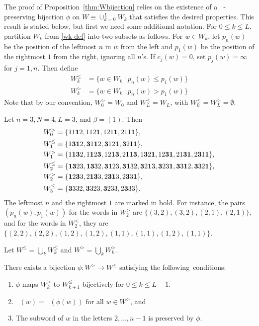\documentclass[ALCO,Unicode]{cedram}
\DeclareMathOperator{\quinvL}{\quinv^{(\ell)}}
\DeclareMathOperator{\quinv}{quinv}
\begin{document}
The proof of Proposition~\ref{thm:Wbijection} relies on the existence of a $\quinvL$-preserving bijection $\phi$ on $W \equiv \cup_{k=0}^L W_k$ that satisfies the desired properties. This result is stated below, but first we need some additional notation. For $0 \leq k \leq L$, partition $W_k$ from \eqref{wk-def} into two subsets as follows. For $w \in W_k$, let $p_n(w)$ be the position of the leftmost $n$ in $w$ from the left and $p_1(w)$ be the position of the rightmost $1$ from the right, ignoring all $n$'s. If $c_j(w)=0$, set $p_j(w)=\infty$ for $j=1,n$. Then define
\begin{align*}
W_k^{\leq}& = \{w\in W_k\ |\ p_n(w) \leq p_1(w)\} \\
W_k^>&= \{w\in W_k\ |\ p_n(w) > p_1(w)\}
\end{align*}
Note that by our convention, $W_0^>=W_0$ and $W_L^\leq=W_L$, with $W_0^\leq=W_L^>=\emptyset$.  
\begin{example}\label{Wkleq-eg}
Let $n=3, N=4, L=3$, and $\beta=(1)$. Then
\begin{align*}
W_0^>&=\{11{\bf1}2,112{\bf1},121{\bf1},211{\bf1}\},\\
W_1^\leq&=\{1{\bf31}2,{\bf3}1{\bf1}2,{\bf3}12{\bf1}, {\bf3}21{\bf1}\},\\
W_1^>&=\{1{\bf13}2, 1{\bf1}2{\bf3},12{\bf13},21{\bf13}, 1{\bf3}2{\bf1},12{\bf31},21{\bf31},2{\bf3}1{\bf1} \}, \\
W_2^\leq &= \{{\bf1 3} 2 3 ,  {\bf1 3} 3 2 ,  {\bf3 1} 2 3,  {\bf3 1} 3 2 ,  {\bf3} 2 {\bf1} 3 ,  {\bf3} 2 3 {\bf1} ,  {\bf3} 3 {\bf1} 2 ,  {\bf3} 3 2 {\bf1} \}, \\
W_2^> &= \{{\bf1}2{\bf3}3, 2{\bf13}3, 2{\bf31}3, 2{\bf3}3{\bf1}\},\\
W_3^\leq &= \{{\bf3}332,{\bf3}323,{\bf3}233,2{\bf3}33\}.
\end{align*}
The leftmost $n$ and the rightmost $1$ are marked in bold. For instance, the pairs $(p_n(w),p_1(w))$ for the words in $W_2^>$ are $\{(3,2), (3,2), (2,1), (2,1)\}$, and for the words in $W_2^\leq$, they are $\{(2,2), (2,2),(1,2),(1,2),(1,1),(1,1),(1,2),(1,1)\}$.
\end{example}

Let $W^\leq = \bigcup_k W_k^\leq$ and $W^> = \bigcup_k W_k^>$. 

\begin{theorem}\label{thm:invol}
There exists a bijection $\phi : W^> \to W^\leq$ satisfying the
following~conditions:
\begin{enumerate}[label=(\arabic*)]
\item \label{it1vvt1} $\phi$ maps $W_k^>$ to $W_{k+1}^\leq$ bijectively for $0 \leq k \leq L-1$.
\item \label{it1vvt2} $\quinvL(w) = \quinvL(\phi(w))$ for all $w \in W^>$, and
\item \label{it1vvt3} The subword of $w$ in the letters $2, \dots, n-1$ is preserved by 
$\phi$.
\end{enumerate}
\end{theorem}
\end{document}
